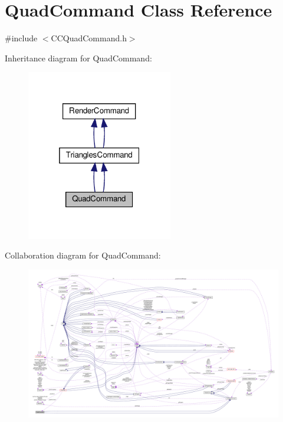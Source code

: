 \hypertarget{classQuadCommand}{}\section{Quad\+Command Class Reference}
\label{classQuadCommand}


{\ttfamily \#include $<$C\+C\+Quad\+Command.\+h$>$}



Inheritance diagram for Quad\+Command\+:
\nopagebreak
\begin{figure}[H]
\begin{center}
\leavevmode
\includegraphics[width=181pt]{classQuadCommand__inherit__graph}
\end{center}
\end{figure}


Collaboration diagram for Quad\+Command\+:
\nopagebreak
\begin{figure}[H]
\begin{center}
\leavevmode
\includegraphics[width=350pt]{classQuadCommand__coll__graph}
\end{center}
\end{figure}
